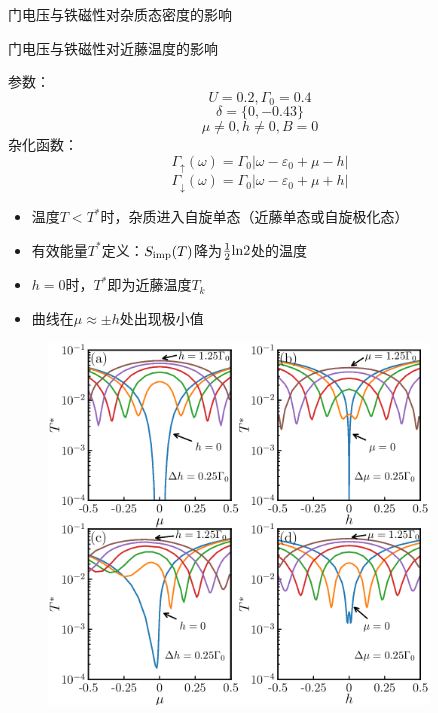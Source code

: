 \documentclass[9pt,t]{beamer} %
\begin{document}
\begin{frame}{门电压与铁磁性对杂质态密度的影响}
\begin{minipage}[t]{0.55 \textwidth}
\begin{figure}
\end{figure}
\end{minipage}
\end{frame}

\begin{frame}{门电压与铁磁性对近藤温度的影响}
\begin{minipage}[t]{0.45 \textwidth}
参数：
\[U=0.2,\Gamma_{0}=0.4\]
\[\delta=\{0,-0.43\}\]
\[\mu\neq 0, h\neq 0, B=0\]
杂化函数：
\[
\Gamma_{\uparrow}(\omega)=\Gamma_{0}\left|\omega-\varepsilon_{0}+\mu- h\right|
\]
\[
\Gamma_{\downarrow}(\omega)=\Gamma_{0}\left|\omega-\varepsilon_{0}+\mu + h\right|
\]
\begin{itemize}
\setlength\itemsep{0.5em}
\item 温度$T<T^{*}$时，杂质进入自旋单态（近藤单态或自旋极化态）
\item 有效能量$T^{*}$定义：$S_{\rm{imp}}(T)$降为$\frac{1}{2}\rm{ln}2$处的温度
\item $h=0$时，$T^{*}$即为近藤温度$T_{k}$
\item 曲线在$\mu\approx \pm h$处出现极小值
\end{itemize}
\end{minipage}%
\begin{minipage}[t]{0.55 \textwidth}
\vspace{0.3cm}
\begin{figure}
\includegraphics[width=0.9\textwidth]{Tk-mu-h.png}
\end{figure}
\end{minipage}
\end{frame}
\end{document}
